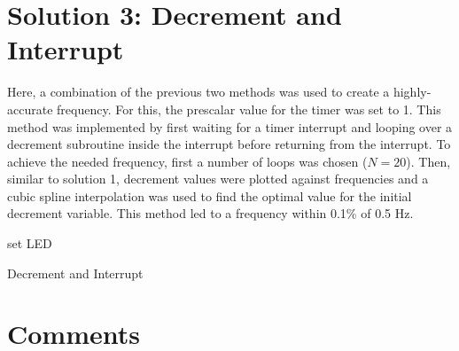 \documentclass{article}
\begin{document}
\section*{Solution 3:  Decrement and Interrupt}

Here, a combination of the previous two methods was used to create a highly-accurate frequency. For this, the prescalar value for the timer was set to 1. This method was implemented by first waiting for a timer interrupt and looping over a decrement subroutine inside the interrupt before returning from the interrupt. To achieve the needed frequency, first a number of loops was chosen ($N = 20$). Then, similar to solution 1, decrement values were plotted against frequencies and a cubic spline interpolation was used to find the optimal value for the initial decrement variable. This method led to a frequency within 0.1\% of 0.5 Hz.


\begin{center}
	\begin{minipage}{0.6\linewidth} %
		\begin{algorithm}[H]
			\medskip
			set LED \;
			\caption{Decrement and Interrupt} %
			\label{alg:DecInt}   %
		\end{algorithm}
	\end{minipage}
\end{center}




\section*{Comments}
\end{document}
